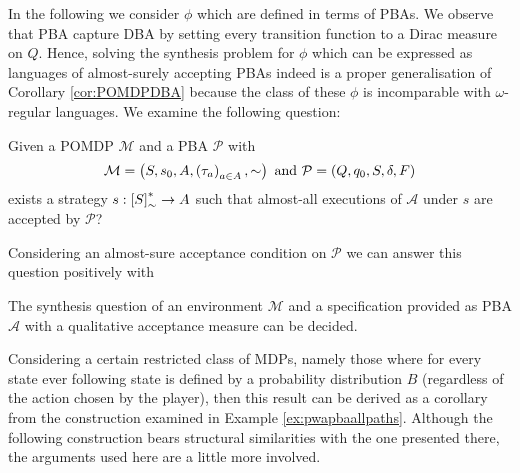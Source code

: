 In the following we consider $\phi$ which are defined in terms of \acp{PBA}. 
We observe that \ac{PBA} capture \ac{DBA} by setting every transition function 
to a Dirac measure on $Q$. Hence, solving the synthesis problem for $\phi$ 
which can be expressed as languages of almost-surely accepting \acp{PBA} indeed 
is a proper generalisation of Corollary \ref{cor:POMDPDBA} because the class of 
these $\phi$ is incomparable with $\omega$-regular languages. We examine the 
following question:
\begin{definition}
  Given a \ac{POMDP} $\mathcal{M}$ and a \ac{PBA} $\mathcal{P}$ with
  \begin{equation*}
    \mathcal{M} = \left(S, s_{0}, A, \left(\tau_{a}\right)_{a\in A}, \sim\right)
  \text{ and }
    \mathcal{P} = \left(Q, q_{0}, S, \delta, F\right)
  \end{equation*}
  exists a strategy $s:\left[S\right]_{\sim}^{*}\rightarrow A$ such that 
  almost-all executions of $\mathcal{A}$ under $s$ are accepted by 
  $\mathcal{P}$?
  \label{def:synthesis}
\end{definition}
Considering an almost-sure acceptance condition on $\mathcal{P}$ we can answer
this question positively with
\begin{theorem}
  The synthesis question of an environment $\mathcal{M}$ and a specification
  provided as \ac{PBA} $\mathcal{A}$ with a qualitative acceptance measure
  can be decided.
  \label{thm:pbasynthesis}
\end{theorem}
Considering a certain restricted class of \acp{MDP}, namely those where for 
every state ever following state is defined by a probability distribution $B$
(regardless of the action chosen by the player), then this result can be 
derived as a corollary from the construction examined in Example 
\ref{ex:pwapbaallpaths}. Although the following construction bears structural
similarities with the one presented there, the arguments used here are a little 
more involved.

